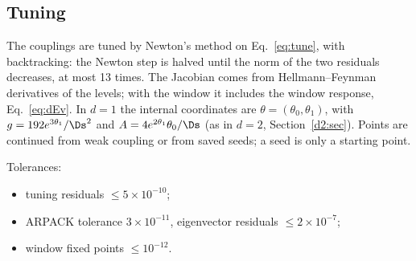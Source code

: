 \subsection{Tuning}
The couplings are tuned by Newton's method on Eq.~\eqref{eq:tune}, with backtracking: the Newton step is halved
until the norm of the two residuals decreases, at most 13 times. The Jacobian comes from Hellmann--Feynman
derivatives of the levels; with the window it includes the window response, Eq.~\eqref{eq:dEv}. In $d=1$ the
internal coordinates are $\theta=(\theta_0,\theta_1)$, with $g=192e^{3\theta_1}/\Ds^2$ and
$A=4e^{2\theta_1}\theta_0/\Ds$ (as in $d=2$, Section~\ref{d2:sec}). Points are
continued from weak coupling or from saved seeds; a seed is only a starting point.

Tolerances:
\begin{itemize}
\item tuning residuals $\le5\times10^{-10}$;
\item ARPACK tolerance $3\times10^{-11}$, eigenvector residuals $\le2\times10^{-7}$;
\item window fixed points $\le10^{-12}$.
\end{itemize}
